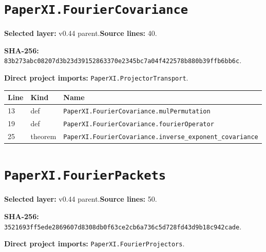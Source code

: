 \documentclass[10pt,oneside]{book}
\begin{document}
\section{\texorpdfstring{\nolinkurl{PaperXI.FourierCovariance}}{PaperXI.FourierCovariance}}\label{module:PaperXI.FourierCovariance}

\textbf{Selected layer:} v0.44 parent.\quad\textbf{Source lines:} 40.\par\textbf{SHA-256:} {\scriptsize\nolinkurl{83b273abc08207d3b23d39152863370e2345bc7a04f422578b880b39ffb6bb6c}}.


\textbf{Direct project imports:} \nolinkurl{PaperXI.ProjectorTransport}.

\begin{longtable}{@{}p{}p{}p{}@{}}\toprule Line&Kind&Name\\\midrule\endhead

13&def&\nolinkurl{PaperXI.FourierCovariance.mulPermutation}\\

19&def&\nolinkurl{PaperXI.FourierCovariance.fourierOperator}\\

25&theorem&\nolinkurl{PaperXI.FourierCovariance.inverse_exponent_covariance}\\

\bottomrule\end{longtable}

\section{\texorpdfstring{\nolinkurl{PaperXI.FourierPackets}}{PaperXI.FourierPackets}}\label{module:PaperXI.FourierPackets}

\textbf{Selected layer:} v0.44 parent.\quad\textbf{Source lines:} 50.\par\textbf{SHA-256:} {\scriptsize\nolinkurl{3521693ff5ede2869607d8308db0f63ce2cb6a736c5d728fd43d9b18c942cade}}.


\textbf{Direct project imports:} \nolinkurl{PaperXI.FourierProjectors}.
\end{document}
